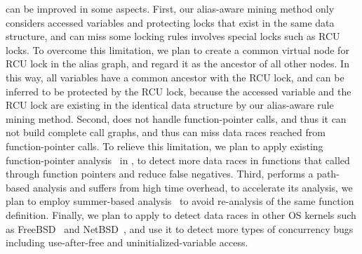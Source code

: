  \sys can be improved in some aspects. First, 
our alias-aware mining method only considers accessed variables and protecting 
locks that exist in the same data structure, and can miss some locking rules 
involves special locks such as RCU locks. To overcome this limitation, we plan 
to create a common virtual node for RCU lock in the alias graph, and regard it 
as the ancestor of all other nodes. In this way, all variables have a common 
ancestor with the RCU lock, and can be inferred to be protected by the RCU 
lock, because the accessed variable and the RCU lock are existing in the 
identical data structure by our alias-aware rule mining method. Second, \sys 
does not handle function-pointer calls, and thus it can not build complete call 
graphs, and thus can miss data races reached from function-pointer calls. To 
relieve this limitation, we plan to apply existing function-pointer 
analysis~\cite{Hind:TOPLAS99, Zhang:ISPEC15, Heintze:PLDI01} in \sys, to detect 
more data races in functions that called through function pointers and reduce 
false negatives. Third, \sys performs a path-based analysis and suffers from 
high time overhead, to accelerate its analysis, we plan to employ summer-based 
analysis~\cite{Bai:ATC19, Bai:ATC22} to avoid re-analysis of the same function 
definition. Finally, we plan to apply \sys to detect data races in other OS 
kernels such as FreeBSD~\cite{FreeBSD} and NetBSD~\cite{NetBSD}, and use it to 
detect more types of concurrency bugs including use-after-free and 
uninitialized-variable access.